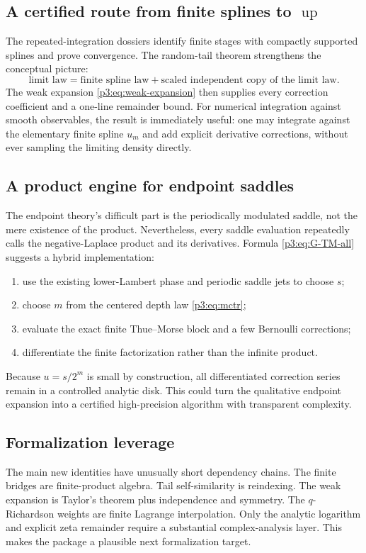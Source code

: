 \documentclass[11pt,oneside]{article}
\numberwithin{equation}{section}
\theoremstyle{definition}
\theoremstyle{remark}
\newcommand{\Up}{\operatorname{up}}
\begin{document}
\subsection{A certified route from finite splines to $\Up$}

The repeated-integration dossiers identify finite stages with compactly supported splines and
prove convergence.  The random-tail theorem strengthens the conceptual picture:
\[
 \text{limit law} = \text{finite spline law} + \text{scaled independent copy of the limit law}.
\]
The weak expansion \eqref{p3:eq:weak-expansion} then supplies every correction coefficient and a
one-line remainder bound.  For numerical integration against smooth observables, the result
is immediately useful: one may integrate against the elementary finite spline $u_m$ and add
explicit derivative corrections, without ever sampling the limiting density directly.

\subsection{A product engine for endpoint saddles}

The endpoint theory's difficult part is the periodically modulated saddle, not the mere
existence of the product.  Nevertheless, every saddle evaluation repeatedly calls the
negative-Laplace product and its derivatives.  Formula \eqref{p3:eq:G-TM-all} suggests a hybrid
implementation:
\begin{enumerate}
\item use the existing lower-Lambert phase and periodic saddle jets to choose $s$;
\item choose $m$ from the centered depth law \eqref{p3:eq:mctr};
\item evaluate the exact finite Thue--Morse block and a few Bernoulli corrections;
\item differentiate the finite factorization rather than the infinite product.
\end{enumerate}
Because $u=s/2^m$ is small by construction, all differentiated correction series remain in a
controlled analytic disk.  This could turn the qualitative endpoint expansion into a
certified high-precision algorithm with transparent complexity.

\subsection{Formalization leverage}

The main new identities have unusually short dependency chains.  The finite bridges are
finite-product algebra.  Tail self-similarity is reindexing.  The weak expansion is Taylor's
theorem plus independence and symmetry.  The $q$-Richardson weights are finite Lagrange
interpolation.  Only the analytic logarithm and explicit zeta remainder require a substantial
complex-analysis layer.  This makes the package a plausible next formalization target.
\end{document}
